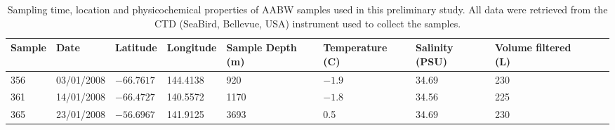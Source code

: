 \begin{table}
\caption[\ac{AABW} samples used in the preliminary analysis]{Sampling time, location and physicochemical properties of \ac{AABW} samples used in this preliminary study.
All data were retrieved from the \ac{CTD} (SeaBird, Bellevue, USA) instrument used to collect the samples.}
\label{tab:deepsamples}
\begin{tabularx}{\textwidth}{llllXXXXXX}
\toprule
\textbf{Sample} & \textbf{Date} & \textbf{Latitude} & \textbf{Longitude} & \textbf{Sample Depth (m)} & \textbf{Temperature (\textdegree{}C)} & \textbf{Salinity (PSU)} & \textbf{Volume \linebreak filtered (L)}\\
\midrule

356 & 03/01/2008 & $-66.7617$ & 144.4138 & 920 & $-1.9$ & 34.69 & 230\\
361 & 14/01/2008 & $-66.4727$ & 140.5572 & 1170 & $-1.8$ & 34.56 & 225\\
365 & 23/01/2008 & $-56.6967$ & 141.9125 & 3693 & 0.5 & 34.69 & 230\\
\bottomrule
\end{tabularx}
\end{table}
